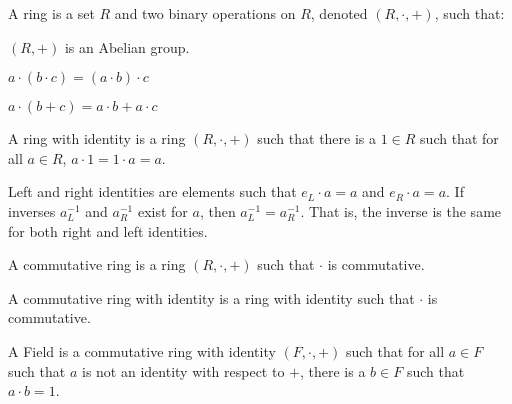\documentclass[crop=false,class=book,oneside]{standalone}
\begin{document}
            \begin{definition}
                A ring is a set $R$ and two binary operations
                on $R$, denoted $(R,\cdot,+)$, such that:
                \begin{enumerate}
                    \begin{multicols}{3}
                    \item $(R,+)$ is an Abelian group.
                    \item $a\cdot({b}\cdot{c})%
                           =({a}\cdot{b})\cdot{c}$
                    \item ${a}\cdot(b+c)%
                           ={a}\cdot{b}+{a}\cdot{c}$
                    \end{multicols}
                \end{enumerate}
            \end{definition}
            \begin{definition}
                A ring with identity is a ring $(R,\cdot,+)$
                such that there is a ${1}\in{R}$ such that for
                all ${a}\in{R}$, ${a}\cdot{1}={1}\cdot{a}=a$.
            \end{definition}
            \begin{remark}
                Left and right identities are elements such
                that ${e_{L}}\cdot{a}=a$ and ${e_{R}}\cdot{a}=a$.
                If inverses $a_{L}^{-1}$ and $a_{R}^{-1}$ exist
                for $a$, then $a_{L}^{-1}=a_{R}^{-1}$. That is,
                the inverse is the same for both right and left
                identities.
            \end{remark}
            \begin{definition}
                A commutative ring is a ring $(R,\cdot,+)$ such that
                $\cdot$ is commutative.
            \end{definition}
            \begin{definition}
                A commutative ring with identity is a
                ring with identity such that $\cdot$
                is commutative.
            \end{definition}
            \begin{definition}
                A Field is a commutative ring with identity
                $(F,\cdot,+)$
                such that for all ${a}\in{F}$ such that
                $a$ is not an identity with respect to $+$,
                there is a $b\in{F}$ such that ${a}\cdot{b}=1$.
            \end{definition}
\end{document}
